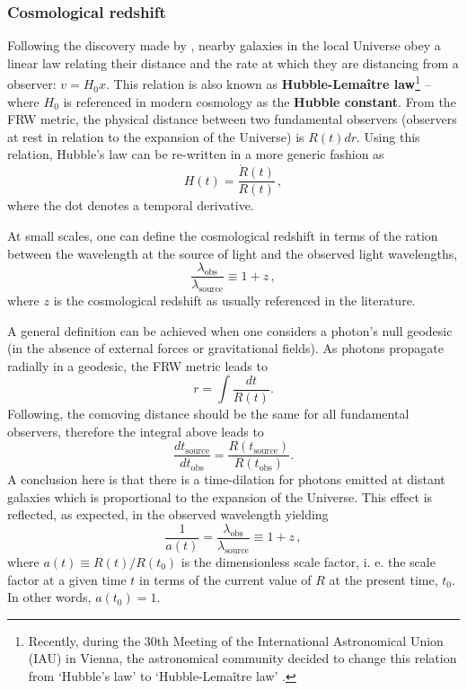 \subsubsection{Cosmological redshift}
Following the discovery made by \cite{1929Hubble}, nearby galaxies in the local Universe obey a linear law relating their distance and the rate at which they are distancing from a observer: $v = H_0x$. This relation is also known as \textbf{Hubble-Lema\^itre law}\footnote{Recently, during the 30th Meeting of the International Astronomical Union (IAU) in Vienna, the astronomical community decided to change this relation from `Hubble's law' to `Hubble-Lemaître law' \citep{2018IAU-HubbleLemaitre}.} -- where $H_0$ is referenced in modern cosmology as the \textbf{Hubble constant}. From the FRW metric, the physical distance between two fundamental observers (observers at rest in relation to the expansion of the Universe) is $R(t)dr$. Using this relation, Hubble's law can be re-written in a more generic fashion as 
\begin{equation}
H(t) = \frac{\dot{R}(t)}{R(t)}\, ,
\end{equation}
where the dot denotes a temporal derivative. 

\qquad At small scales, one can define the cosmological redshift in terms of the ration between the wavelength at the source of light and the observed light wavelengths,
\begin{equation}
\frac{\lambda_{\text{obs}}}{\lambda_{\text{source}}}  \equiv 1 + z\, ,
\end{equation}
where $z$ is the cosmological redshift as usually referenced in the literature. 

\qquad A general definition can be achieved when one considers a photon's null geodesic (in the absence of external forces or gravitational fields). As photons propagate radially in a geodesic, the FRW metric leads to 
\begin{equation}
r = \int \frac{dt}{R(t)}.
\end{equation}
Following, the comoving distance should be the same for all fundamental observers, therefore the integral above leads to
\begin{equation}
\frac{dt_{\text{source}}}{dt_{\text{obs}}} = \frac{R(t_{\text{source}})}{R(t_{\text{obs}})}.
\end{equation}
A conclusion here is that there is a time-dilation for photons emitted at distant galaxies which is proportional to the expansion of the Universe. This effect is reflected, as expected, in the observed wavelength yielding
\begin{equation}
\frac{1}{a(t)} = \frac{\lambda_{\text{obs}}}{\lambda_{\text{source}}}  \equiv 1 + z \, ,
\end{equation}
where $a(t) \equiv R(t)/R(t_0)$ is the dimensionless scale factor, i. e. the scale factor at a given time $t$ in terms of the current value of $R$ at the present time, $t_0$. In other words, $a(t_0) = 1$.

